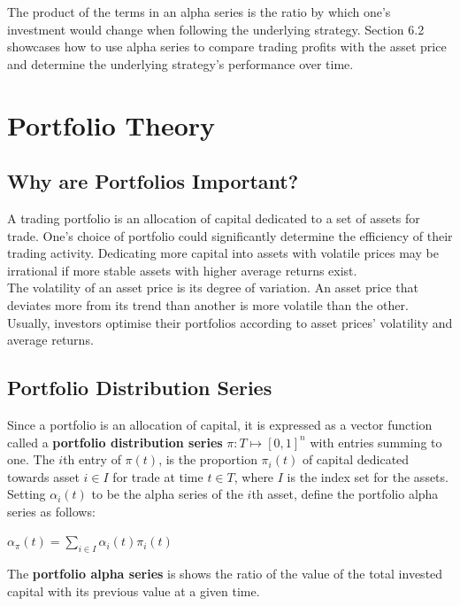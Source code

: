 \documentclass[11pt]{article}
\begin{document}
The product of the terms in an alpha series is the ratio by which one's investment would change when following the underlying strategy. Section 6.2 showcases how to use alpha series to compare trading profits with the asset price and determine the underlying strategy's performance over time.

\section{Portfolio Theory}

\subsection{Why are Portfolios Important?}
A trading portfolio is an allocation of capital dedicated to a set of assets for trade. One's choice of portfolio could significantly determine the efficiency of their trading activity. Dedicating more capital into assets with volatile prices may be irrational if more stable assets with higher average returns exist.\\

The volatility of an asset price is its degree of variation. An asset price that deviates more from its trend than another is more volatile than the other. Usually, investors optimise their portfolios according to asset prices' volatility and average returns.

\subsection{Portfolio Distribution Series}

Since a portfolio is an allocation of capital, it is expressed as a vector function called a \textbf{portfolio distribution series} $\pi:T \mapsto [0,1]^{n}$ with entries summing to one. The $i$th entry of $\pi(t)$, is the proportion $\pi_{i}(t)$ of capital dedicated towards asset $i \in I$ for trade at time $t \in T$, where $I$ is the index set for the assets.\\

Setting $\alpha_{i}(t)$ to be the alpha series of the $i$th asset, define the portfolio alpha series as follows:
\begin{center}
    $\alpha_{\pi}(t)=\sum_{i \in I}\alpha_{i}(t)\pi_{i}(t)$
\end{center}

The \textbf{portfolio alpha series} is shows the ratio of the value of the total invested capital with its previous value at a given time.
\end{document}
